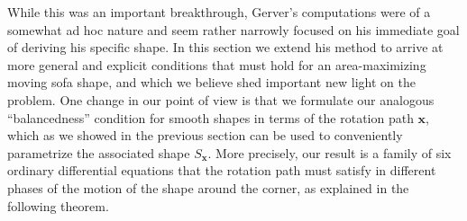 \documentclass[11pt]{article}
\begin{document}
While this was an important breakthrough, Gerver's computations were of a somewhat ad hoc nature and seem rather narrowly focused on his immediate goal of deriving his specific shape. In this section we extend his method to arrive at more general and explicit conditions that must hold for an area-maximizing moving sofa shape, and which we believe shed important new light on the problem. One change in our point of view is that we formulate our analogous ``balancedness'' condition for smooth shapes in terms of the rotation path $\mathbf{x}$, which as we showed in the previous section can be used to conveniently parametrize the associated shape $S_{\mathbf{x}}$.
More precisely, our result is a family of six ordinary differential equations that the rotation path must satisfy in different phases of the motion of the shape around the corner, as explained in the following theorem.
\end{document}
